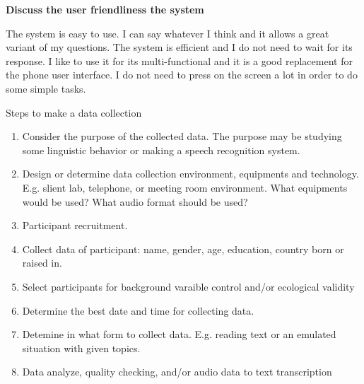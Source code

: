 \documentclass[12pt]{article}
\newenvironment{problem}[2][Problem]{\begin{trivlist}
\item[\hskip \labelsep {\bfseries #1}\hskip \labelsep {\bfseries #2.}]}{\end{trivlist}}
\begin{document}
\begin{problem}{3.3}
    \textbf{Discuss the user friendliness the system}

    The system is easy to use. I can say whatever I think and it allows a great
    variant of my questions. The system is efficient and I do not need to wait
    for its response. I like to use it for its multi-functional and it is a 
    good replacement for the phone user interface. I do not need to press on 
    the screen a lot in order to do some simple tasks.
\end{problem}

\pagebreak
\begin{problem}{4.1}
    Steps to make a data collection
    \begin{enumerate}
        \item Consider the purpose of the collected data. The purpose may be
        studying some linguistic behavior or making a speech recognition system.
        \item Design or determine data collection environment, equipments and technology.
        E.g. slient lab, telephone, or meeting room environment.
        What equipments would be used? What audio format should be used?
        \item Participant recruitment.
        \item Collect data of participant: name, gender, age, education, country born or raised in.
        \item Select participants for background varaible control and/or ecological validity
        \item Determine the best date and time for collecting data.
        \item Detemine in what form to collect data.
        E.g. reading text or an emulated situation with given topics.
        \item Data analyze, quality checking, and/or audio data to text transcription
    \end{enumerate}
\end{problem}
\end{document}

